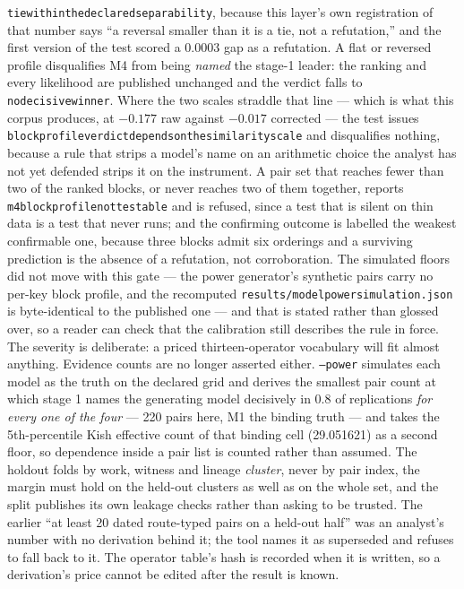 \documentclass[11pt]{article}
\DeclareRobustCommand{\_}{\textunderscore\allowbreak}
\begin{document}
\texttt{tie\_within\_the\_declared\_separability}, because this layer's own registration of that number says
``a reversal smaller than it is a tie, not a refutation,'' and the first version of the test scored a
\(0.0003\) gap as a refutation. A flat or reversed profile disqualifies M4 from being \emph{named} the
stage-1 leader: the ranking and every likelihood are published
unchanged and the verdict falls to \texttt{no\_decisive\_winner}. Where the two scales straddle that line ---
which is what this corpus produces, at \(-0.177\) raw against \(-0.017\) corrected --- the test issues
\texttt{block\_profile\_verdict\_depends\_on\_the\_similarity\_scale} and disqualifies nothing, because a rule
that strips a model's name on an arithmetic choice the analyst has not yet defended strips it on the
instrument. A pair set that reaches fewer than two of the
ranked blocks, or never reaches two of them together, reports \texttt{m4\_block\_profile\_not\_testable} and is
refused, since a test that is silent on thin data is a test that never runs; and the confirming outcome is
labelled the weakest confirmable one, because three blocks admit six orderings and a surviving prediction is
the absence of a refutation, not corroboration. The simulated floors did not move with this gate --- the power
generator's synthetic pairs carry no per-key block profile, and the recomputed
\texttt{results/model\_power\_simulation.json} is byte-identical to the published one --- and that is stated
rather than glossed over, so
a reader can check that the calibration still describes the rule in force. The severity is deliberate: a priced
thirteen-operator vocabulary will fit almost anything. Evidence counts are no longer asserted either. \texttt{--power} simulates each model as the
truth on the declared grid and derives the smallest pair count at which stage 1 names the generating model
decisively in 0.8 of replications \emph{for every one of the four} --- 220 pairs here, M1 the binding truth ---
and takes the 5th-percentile Kish effective count of that binding cell (29.051621) as a second floor, so
dependence inside a pair list is counted rather than assumed. The holdout folds by work, witness and lineage
\emph{cluster}, never by pair index, the margin must hold on the held-out clusters as well as on the whole
set, and the split publishes its own leakage checks rather than asking to be trusted. The earlier ``at least 20
dated route-typed pairs on a held-out half'' was an analyst's number with no derivation behind it; the tool
names it as superseded and refuses to fall back to it. The operator table's hash is recorded when it is
written, so a derivation's price cannot be edited after the result is known.
\end{document}
